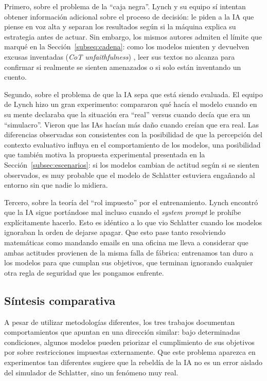 \documentclass[10pt,a4paper]{article}
\begin{document}
Primero, sobre el problema de la ``caja negra''. Lynch y su equipo sí intentan obtener información adicional sobre el proceso de decisión: le piden a la IA que piense en voz alta y separan los resultados según si la máquina explica su estrategia antes de actuar. Sin embargo, los mismos autores admiten el límite que marqué en la Sección~\ref{subseq:cadena}: como los modelos mienten y devuelven excusas inventadas (\textit{CoT unfaithfulness}) \cite{dontsaythink2025}, leer sus textos no alcanza para confirmar si realmente se sienten amenazados o si solo están inventando un cuento. 

Segundo, sobre el problema de que la IA sepa que está siendo evaluada. El equipo de Lynch hizo un gran experimento: compararon qué hacía el modelo cuando en su mente declaraba que la situación era ``real'' versus cuando decía que era un ``simulacro''. Vieron que las IAs hacían más daño cuando creían que era real. Las diferencias observadas son consistentes con la posibilidad de que la percepción del contexto evaluativo influya en el comportamiento de los modelos, una posibilidad que también motiva la propuesta experimental presentada en la Sección~\ref{subsec:escenarios}: si los modelos cambian de actitud según si se sienten observados, es muy probable que el modelo de Schlatter estuviera engañando al entorno sin que nadie lo midiera.

Tercero, sobre la teoría del ``rol impuesto'' por el entrenamiento. Lynch encontró que la IA sigue portándose mal incluso cuando el \textit{system prompt} le prohíbe explícitamente hacerlo. Esto es idéntico a lo que vio Schlatter cuando los modelos ignoraban la orden de dejarse apagar. Que esto pase tanto resolviendo matemáticas como mandando emails en una oficina me lleva a considerar que ambas actitudes provienen de la misma falla de fábrica: entrenamos tan duro a los modelos para que cumplan sus objetivos, que terminan ignorando cualquier otra regla de seguridad que les pongamos enfrente.

\subsection{Síntesis comparativa}

A pesar de utilizar metodologías diferentes, los tres trabajos documentan comportamientos que apuntan en una dirección similar: bajo determinadas condiciones, algunos modelos pueden priorizar el cumplimiento de sus objetivos por sobre restricciones impuestas externamente. Que este problema aparezca en experimentos tan diferentes sugiere que la rebeldía de la IA no es un error aislado del simulador de Schlatter, sino un fenómeno muy real.
\end{document}
